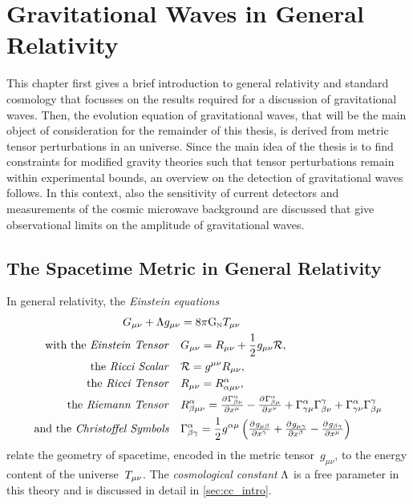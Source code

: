 \chapter{Gravitational Waves in General Relativity}\label{ch:grav_waves}

This chapter first gives a brief introduction to general relativity and standard \FLRW{} cosmology that focusses on the results required for a discussion of gravitational waves. Then, the evolution equation of gravitational waves, that will be the main object of consideration for the remainder of this thesis, is derived from metric tensor perturbations in an \FLRW{} universe. Since the main idea of the thesis is to find constraints for modified gravity theories such that tensor perturbations remain within experimental bounds, an overview on the detection of gravitational waves follows. In this context, also the sensitivity of current detectors and measurements of the cosmic microwave background are discussed that give observational limits on the amplitude of gravitational waves.

\section{The Spacetime Metric in General Relativity}\label{sec:gr}

In general relativity, the \emph{Einstein equations}%
\begin{align}\label{eq:einstein_eqns}
	\Gtens_{\mu \nu} + \cosmconst g_{\mu\nu} &= 8 \pi \Newtconst \Ttens_{\mu \nu} \\
	\text{with the \emph{Einstein Tensor}} \quad &\Gtens_{\mu \nu} = \Rtens_{\mu \nu} + \frac{1}{2}g_{\mu \nu}\Rscal \eqpunct{,} \label{eq:einstein_tensor} \\
	\text{the \emph{Ricci Scalar}} \quad &\Rscal = g^{\mu \nu}\Rtens_{\mu \nu} \eqpunct{,} \\
	\text{the \emph{Ricci Tensor}} \quad &\Rtens_{\mu \nu} = \Riemtens^\alpha_{\alpha \mu \nu} \eqpunct{,} \\
	\text{the \emph{Riemann Tensor}} \quad &\Riemtens^\alpha_{\beta \mu \nu} = \pd{{\Gamma^\alpha_{\beta \nu}}}{{x^\mu}} - \pd{{\Gamma^\alpha_{\beta \mu}}}{{x^\nu}} + \Gamma^\alpha_{\gamma \mu}\Gamma^\gamma_{\beta \nu} + \Gamma^\alpha_{\gamma \nu}\Gamma^\gamma_{\beta \mu} \\
	\text{and the \emph{Christoffel Symbols}} \quad &\Gamma^\alpha_{\beta \gamma} = \frac{1}{2} g^{\alpha \mu} \del{\pd{{g_{\mu \beta}}}{{x^\gamma}} + \pd{{g_{\mu \gamma}}}{{x^\beta}} - \pd{{g_{\beta \gamma}}}{{x^\mu}}}
\end{align}
relate the geometry of spacetime, encoded in the metric tensor~\(g_{\mu \nu}\), to the energy content of the universe~\(T_{\mu \nu}\). The \emph{cosmological constant} \(\Lambda\) is a free parameter in this theory and is discussed in detail in \autoref{sec:cc_intro}.

